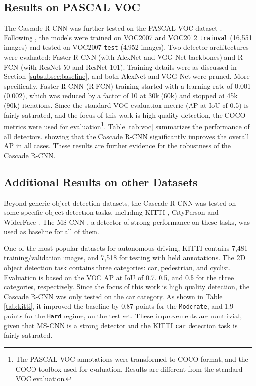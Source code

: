 \documentclass[10pt,journal,compsoc]{IEEEtran}
\begin{document}
\subsection{Results on PASCAL VOC}
\label{subsec:voc}

The Cascade R-CNN was further tested on the PASCAL VOC
dataset \cite{DBLP:journals/ijcv/EveringhamGWWZ10}.
Following \cite{DBLP:conf/nips/RenHGS15,DBLP:conf/eccv/LiuAESRFB16}, the
models were trained on VOC2007 and VOC2012 \texttt{trainval} (16,551
images) and tested on VOC2007 \texttt{test} (4,952 images). Two
detector architectures were evaluated: Faster R-CNN (with AlexNet and
VGG-Net backbones) and R-FCN (with ResNet-50 and
ResNet-101). Training details were as discussed in
Section \ref{subsubsec:baseline}, and both AlexNet and VGG-Net were pruned.
More specifically, Faster R-CNN (R-FCN) training started with a learning
rate of 0.001 (0.002), which was reduced by a factor of 10 at 30k (60k) and
stopped at 45k (90k) iterations. Since the standard VOC evaluation
metric (AP at IoU of 0.5) is fairly saturated, and the focus of this work is
high quality detection, the COCO metrics were used
for evaluation\footnote{The PASCAL VOC annotations were transformed to COCO
format, and the COCO toolbox used for evaluation. Results are different
from the standard VOC evaluation.}. Table \ref{tab:voc} summarizes the
performance of all detectors, showing that the Cascade R-CNN significantly
improves the overall AP in all cases. These results are further
evidence for the robustness of the Cascade R-CNN.


\subsection{Additional Results on other Datasets}
\label{subsec:kitti+cityperson}

Beyond generic object detection datasets, the Cascade R-CNN was tested
on some specific object detection tasks, including
KITTI \cite{DBLP:conf/cvpr/GeigerLU12},
CityPerson \cite{DBLP:conf/cvpr/ZhangBS17} and
WiderFace \cite{DBLP:conf/cvpr/YangLLT16}. The
MS-CNN \cite{DBLP:conf/eccv/CaiFFV16}, a detector of strong performance on
these tasks, was used as baseline for all of them.

\vspace{0.2cm}
One of the most popular datasets for autonomous driving, KITTI contains
7,481 training/validation images, and 7,518 for testing with held
annotations. The 2D object detection task contains three categories: car,
pedestrian, and cyclist. Evaluation is based on the VOC AP at IoU of 0.7,
 0.5, and 0.5 for the three categories, respectively. Since the focus
of this work is high quality detection, the Cascade R-CNN was only
tested on the car category. As shown in Table \ref{tab:kitti},
it improved the baseline by 0.87 points for the \texttt{Moderate}, and 1.9
points for the \texttt{Hard} regime, on the test set. These improvements
are nontrivial, given that MS-CNN is a strong detector and the
KITTI \texttt{car} detection task is fairly saturated.
\end{document}
